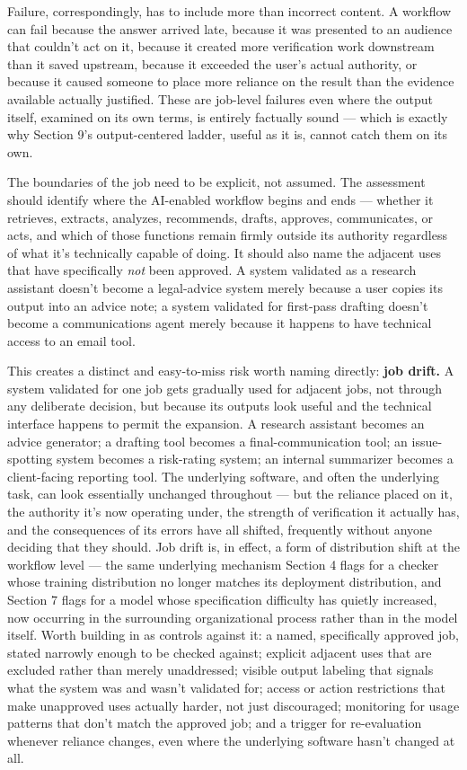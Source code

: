 Failure, correspondingly, has to include more than incorrect content. A workflow can fail because the answer arrived late, because it was presented to an audience that couldn't act on it, because it created more verification work downstream than it saved upstream, because it exceeded the user's actual authority, or because it caused someone to place more reliance on the result than the evidence available actually justified. These are job-level failures even where the output itself, examined on its own terms, is entirely factually sound --- which is exactly why Section 9's output-centered ladder, useful as it is, cannot catch them on its own.

The boundaries of the job need to be explicit, not assumed. The assessment should identify where the AI-enabled workflow begins and ends --- whether it retrieves, extracts, analyzes, recommends, drafts, approves, communicates, or acts, and which of those functions remain firmly outside its authority regardless of what it's technically capable of doing. It should also name the adjacent uses that have specifically \emph{not} been approved. A system validated as a research assistant doesn't become a legal-advice system merely because a user copies its output into an advice note; a system validated for first-pass drafting doesn't become a communications agent merely because it happens to have technical access to an email tool.

This creates a distinct and easy-to-miss risk worth naming directly: \textbf{job drift.} A system validated for one job gets gradually used for adjacent jobs, not through any deliberate decision, but because its outputs look useful and the technical interface happens to permit the expansion. A research assistant becomes an advice generator; a drafting tool becomes a final-communication tool; an issue-spotting system becomes a risk-rating system; an internal summarizer becomes a client-facing reporting tool. The underlying software, and often the underlying task, can look essentially unchanged throughout --- but the reliance placed on it, the authority it's now operating under, the strength of verification it actually has, and the consequences of its errors have all shifted, frequently without anyone deciding that they should. Job drift is, in effect, a form of distribution shift at the workflow level --- the same underlying mechanism Section 4 flags for a checker whose training distribution no longer matches its deployment distribution, and Section 7 flags for a model whose specification difficulty has quietly increased, now occurring in the surrounding organizational process rather than in the model itself. Worth building in as controls against it: a named, specifically approved job, stated narrowly enough to be checked against; explicit adjacent uses that are excluded rather than merely unaddressed; visible output labeling that signals what the system was and wasn't validated for; access or action restrictions that make unapproved uses actually harder, not just discouraged; monitoring for usage patterns that don't match the approved job; and a trigger for re-evaluation whenever reliance changes, even where the underlying software hasn't changed at all.

